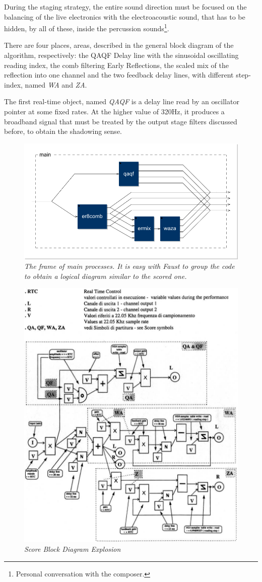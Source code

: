\documentclass[twoside,a4paper]{article}
\begin{document}
During the staging strategy, the entire sound direction must be focused on the balancing of the live electronics with the electroacoustic sound, that has to be hidden, by all of these, inside the percussion sounds\footnote{Personal conversation with the composer.}.

There are four places, areas, described in the general block diagram of the algorithm, respectively: the QAQF Delay line with the sinusoidal oscillating reading index, the comb filtering  Early Reflections, the scaled mix of the reflection into one channel and the two feedback delay lines, with different step-index, named \emph{WA} and \emph{ZA}.

The first real-time object, named \emph{QAQF} is a delay line read by an oscillator pointer at some fixed rates. At the higher value of 320Hz, it produces a broadband signal that must be treated by the output stage filters discussed before, to obtain the shadowing sense.

\begin{figure}[hb]
\centerline{\includegraphics[width=.45\textwidth]{img/main}}
\caption{\label{ml-main}{\it The frame of main processes. It is easy with Faust to group the code to obtain a logical diagram similar to the scored one. }}
\end{figure}

\begin{figure}[ht]
\centerline{\includegraphics[width=.45\textwidth]{img/2-comp}}
\caption{\label{ml-dia-exp}{\it Score Block Diagram Explosion}}
\end{figure}
\end{document}
